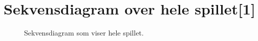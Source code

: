 \newpage
\chapter{Sekvensdiagram over hele spillet[1]}\label{app:sekvensComplete}

\begin{figure}
\centering
\caption{Sekvensdiagram som viser hele spillet.}\label{fig:tikzSekvensComplete}

\end{figure}